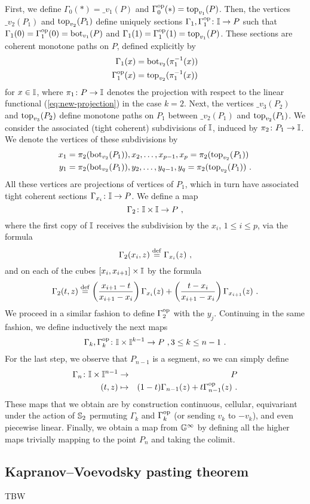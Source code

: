 First, we define $\Gamma_0 (*) = \bm_{v_1}(P)$ and $\Gamma_0^{\mathrm{op}} (*) = \operatorname{top}_{v_1}(P)$.
Then, the vertices $\bm_{v_2}(P_1)$ and $\operatorname{top}_{v_2}(P_1)$ define uniquely sections $\Gamma_1, \Gamma_1^{\mathrm{op}} \colon \mathbb{I} \to P$ such that $\Gamma_1(0)=\Gamma_1^{\mathrm{op}}(0)=\operatorname{bot}_{v_1}(P)$ and $\Gamma_1(1)=\Gamma_1^{\mathrm{op}}(1)=\operatorname{top}_{v_1}(P)$.
These sections are coherent monotone paths on $P$, defined explicitly by
\begin{align*}
	\Gamma_1(x) & = \operatorname{bot}_{v_2}(\pi_1^{-1}(x)) \\
	\Gamma_1^{\mathrm{op}}(x) & = \operatorname{top}_{v_2}(\pi_1^{-1}(x))
\end{align*}
for $x \in \mathbb{I}$, where $\pi_1 \colon P \to \mathbb{I}$ denotes the projection with respect to the linear functional (\ref{eq:new-projection}) in the case $k=2$.
Next, the vertices $\bm_{v_3}(P_2)$ and $\operatorname{top}_{v_3}(P_2)$ define monotone paths on $P_1$ between $\bm_{v_2}(P_1)$ and $\operatorname{top}_{v_2}(P_1)$.
We consider the associated (tight coherent) subdivisions of $\mathbb{I}$, induced by $\pi_2 \colon P_1 \to \mathbb{I}$.
We denote the vertices of these subdivisions by
\begin{align*}
	x_1 & = \pi_2(\operatorname{bot}_{v_2}(P_1)), x_2, \ldots, x_{p-1}, x_p=\pi_2(\operatorname{top}_{v_2}(P_1)) \\
	y_1 & = \pi_2(\operatorname{bot}_{v_2}(P_1)), y_2, \ldots, y_{q-1}, y_q=\pi_2(\operatorname{top}_{v_2}(P_1)) \ .
\end{align*}
All these vertices are projections of vertices of $P_1$, which in turn have associated tight coherent sections $\Gamma_{x_i} \colon \mathbb{I} \to P$.
We define a map
\[
\Gamma_2 \colon \mathbb{I} \times \mathbb{I} \to P \ ,
\]
where the first copy of $\mathbb{I}$ receives the subdivision by the $x_i$, $1\leq i \leq p$, via the formula
\[
\Gamma_2(x_i, z) \stackrel{\mathrm{def}}{=} \Gamma_{x_i}(z) \ ,
\]
and on each of the cubes $[x_i,x_{i+1}] \times \mathbb{I}$ by the formula
\[
\Gamma_2(t,z) \stackrel{\mathrm{def}}{=} \left( \frac{x_{i+1}-t}{x_{i+1}-x_i} \right) \Gamma_{x_i}(z) + \left( \frac{t-x_i}{x_{i+1}-x_i} \right) \Gamma_{x_{i+1}}(z) \ .
\]
We proceed in a similar fashion to define $\Gamma_2^{\mathrm{op}}$ with the $y_j$.
Continuing in the same fashion, we define inductively the next maps
\[
\Gamma_k, \Gamma_k^{\mathrm{op}} \colon \mathbb{I} \times \mathbb{I}^{k-1} \to P \ , 3 \leq k \leq n-1 \ .
\]
For the last step, we observe that $P_{n-1}$ is a segment, so we can simply define
\begin{eqnarray*}
	\Gamma_n \colon \mathbb{I} \times \mathbb{I}^{n-1} & \to & P \\
	(t,z) & \mapsto & (1-t)\Gamma_{n-1}(z) + t \Gamma_{n-1}^{\mathrm{op}} (z) \ .
\end{eqnarray*}
These maps that we obtain are by construction continuous, cellular, equivariant under the action of $\mathbb{S}_2$ permuting $\Gamma_k$ and $\Gamma_k^{\mathrm{op}}$ (or sending $v_k$ to $-v_k$), and even piecewise linear.
Finally, we obtain a map from $\mathbb{G}^\infty$ by defining all the higher maps trivially mapping to the point $P_n$ and taking the colimit.

\subsection{Kapranov--Voevodsky pasting theorem}

TBW